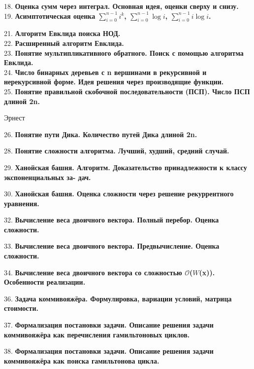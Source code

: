 \documentclass[12pt]{article}
\begin{document}
18. \textbf{Оценка сумм через интеграл. Основная идея, оценки сверху и снизу.}\\

19. \textbf{Асимптотическая оценка $\sum_{i=0}^{n-1} i^k$, $\sum_{i=0}^{n-1} \log i$, $\sum_{i=0}^{n-1} i\log i$.}

21. \textbf{Алгоритм Евклида поиска НОД.}\\

22. \textbf{Расширенный алгоритм Евклида.}\\

23. \textbf{Понятие мультипликативного обратного. Поиск с помощью алгоритма Евклида.}\\

24. \textbf{Число бинарных деревьев с n вершинами в рекурсивной и нерекурсивной форме. Идея решения через производящие функции.}\\

25. \textbf{Понятие правильной скобочной последовательности (ПСП). Число ПСП длиной 2n.}\\

\begin{center}
    Эрнест
\end{center}

26. \textbf{Понятие пути Дика. Количество путей Дика длиной 2n.}

28. \textbf{Понятие сложности алгоритма. Лучший, худший, средний случай.}

29. \textbf{Ханойская башня. Алгоритм. Доказательство принадлежности к классу экспоненциальных за- дач.}

30. \textbf{Ханойская башня. Оценка сложности через решение рекуррентного уравнения.}

32. \textbf{Вычисление веса двоичного вектора. Полный перебор. Оценка сложности.}

33. \textbf{Вычисление веса двоичного вектора. Предвычисление. Оценка сложности.}

34. \textbf{Вычисление веса двоичного вектора со сложностью $\mathcal{O}$($W$(x)). Особенности реализации.}

36. \textbf{Задача коммивояжёра. Формулировка, вариации условий, матрица стоимости.}

37. \textbf{Формализация постановки задачи. Описание решения задачи коммивояжёра как перечисления гамильтоновых циклов.}

38. \textbf{Формализация постановки задачи. Описание решения задачи коммивояжёра как поиска гамильтонова цикла.}
\end{document}
